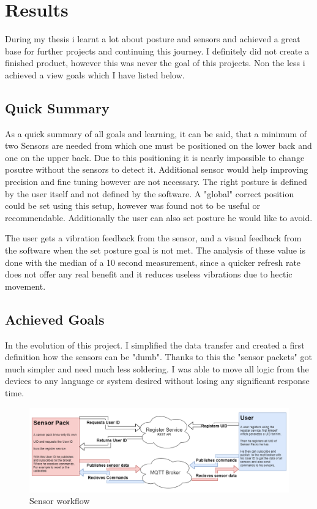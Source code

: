 \chapter*{Results}
\label{chap:Results}
\setcounter{section}{0}

During my thesis i learnt a lot about posture and sensors and achieved a great base for further projects and continuing this journey. I definitely did not create a finished product, however this was never the goal of this projects. Non the less i achieved a view goals which I have listed below.

\section{Quick Summary}

As a quick summary of all goals and learning, it can be said, that a minimum of two Sensors are needed from which one must be positioned on the lower back and one on the upper back. Due to this positioning it is nearly impossible to change posutre without the sensors to detect it. Additional sensor would help improving precision and fine tuning however are not necessary. The right posture is defined by the user itself and not defined by the software. A "global" correct position could be set using this setup, however was found not to be useful or recommendable. \cite{SitUpSt77:online} Additionally the user can also set posture he would like to avoid.

The user gets a vibration feedback from the sensor, and a visual feedback from the software when the set posture goal is not met. The analysis of these value is done with the median of a 10 second measurement, since a quicker refresh rate does not offer any real benefit and it reduces useless vibrations due to hectic movement.

\section{Achieved Goals}

In the evolution of this project. I simplified the data transfer and created a first definition how the sensors can be "dumb". Thanks to this the "sensor packets" got much simpler and need much less soldering. I was able to move all logic from the devices to any language or system desired without losing any significant response time. 

\begin{figure}[h]
  \begin{center}
\includegraphics[width=\textwidth]{images/DumbSensor.png}
  \end{center}
  \caption{Sensor workflow}
  \label{fig:SensorWorkflow}
\end{figure}

